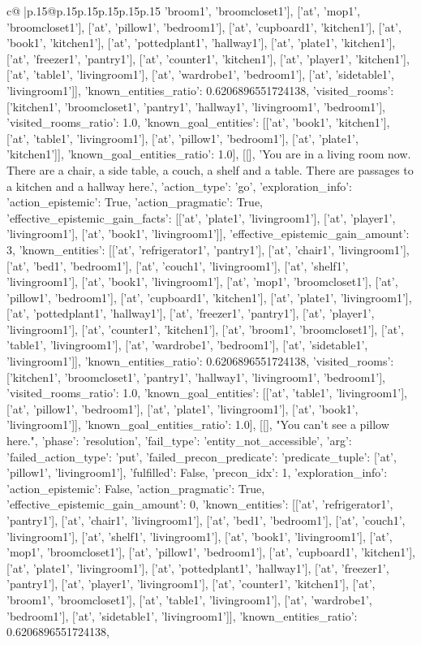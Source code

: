 \documentclass{article}
\begin{document}
{\begin{supertabular}{c@{$\;$}|p{.15\linewidth}@{}p{.15\linewidth}p{.15\linewidth}p{.15\linewidth}p{.15\linewidth}p{.15\linewidth}}
{{{'broom1', 'broomcloset1'], ['at', 'mop1', 'broomcloset1'], ['at', 'pillow1', 'bedroom1'], ['at', 'cupboard1', 'kitchen1'], ['at', 'book1', 'kitchen1'], ['at', 'pottedplant1', 'hallway1'], ['at', 'plate1', 'kitchen1'], ['at', 'freezer1', 'pantry1'], ['at', 'counter1', 'kitchen1'], ['at', 'player1', 'kitchen1'], ['at', 'table1', 'livingroom1'], ['at', 'wardrobe1', 'bedroom1'], ['at', 'sidetable1', 'livingroom1']], 'known_entities_ratio': 0.6206896551724138, 'visited_rooms': ['kitchen1', 'broomcloset1', 'pantry1', 'hallway1', 'livingroom1', 'bedroom1'], 'visited_rooms_ratio': 1.0, 'known_goal_entities': [['at', 'book1', 'kitchen1'], ['at', 'table1', 'livingroom1'], ['at', 'pillow1', 'bedroom1'], ['at', 'plate1', 'kitchen1']], 'known_goal_entities_ratio': 1.0}}], [[], 'You are in a living room now. There are a chair, a side table, a couch, a shelf and a table. There are passages to a kitchen and a hallway here.', {'action_type': 'go', 'exploration_info': {'action_epistemic': True, 'action_pragmatic': True, 'effective_epistemic_gain_facts': [['at', 'plate1', 'livingroom1'], ['at', 'player1', 'livingroom1'], ['at', 'book1', 'livingroom1']], 'effective_epistemic_gain_amount': 3, 'known_entities': [['at', 'refrigerator1', 'pantry1'], ['at', 'chair1', 'livingroom1'], ['at', 'bed1', 'bedroom1'], ['at', 'couch1', 'livingroom1'], ['at', 'shelf1', 'livingroom1'], ['at', 'book1', 'livingroom1'], ['at', 'mop1', 'broomcloset1'], ['at', 'pillow1', 'bedroom1'], ['at', 'cupboard1', 'kitchen1'], ['at', 'plate1', 'livingroom1'], ['at', 'pottedplant1', 'hallway1'], ['at', 'freezer1', 'pantry1'], ['at', 'player1', 'livingroom1'], ['at', 'counter1', 'kitchen1'], ['at', 'broom1', 'broomcloset1'], ['at', 'table1', 'livingroom1'], ['at', 'wardrobe1', 'bedroom1'], ['at', 'sidetable1', 'livingroom1']], 'known_entities_ratio': 0.6206896551724138, 'visited_rooms': ['kitchen1', 'broomcloset1', 'pantry1', 'hallway1', 'livingroom1', 'bedroom1'], 'visited_rooms_ratio': 1.0, 'known_goal_entities': [['at', 'table1', 'livingroom1'], ['at', 'pillow1', 'bedroom1'], ['at', 'plate1', 'livingroom1'], ['at', 'book1', 'livingroom1']], 'known_goal_entities_ratio': 1.0}}], [[], "You can't see a pillow here.", {'phase': 'resolution', 'fail_type': 'entity_not_accessible', 'arg': {'failed_action_type': 'put', 'failed_precon_predicate': {'predicate_tuple': ['at', 'pillow1', 'livingroom1'], 'fulfilled': False, 'precon_idx': 1}}, 'exploration_info': {'action_epistemic': False, 'action_pragmatic': True, 'effective_epistemic_gain_amount': 0, 'known_entities': [['at', 'refrigerator1', 'pantry1'], ['at', 'chair1', 'livingroom1'], ['at', 'bed1', 'bedroom1'], ['at', 'couch1', 'livingroom1'], ['at', 'shelf1', 'livingroom1'], ['at', 'book1', 'livingroom1'], ['at', 'mop1', 'broomcloset1'], ['at', 'pillow1', 'bedroom1'], ['at', 'cupboard1', 'kitchen1'], ['at', 'plate1', 'livingroom1'], ['at', 'pottedplant1', 'hallway1'], ['at', 'freezer1', 'pantry1'], ['at', 'player1', 'livingroom1'], ['at', 'counter1', 'kitchen1'], ['at', 'broom1', 'broomcloset1'], ['at', 'table1', 'livingroom1'], ['at', 'wardrobe1', 'bedroom1'], ['at', 'sidetable1', 'livingroom1']], 'known_entities_ratio': 0.6206896551724138, }}}
\end{supertabular}}
\end{document}
